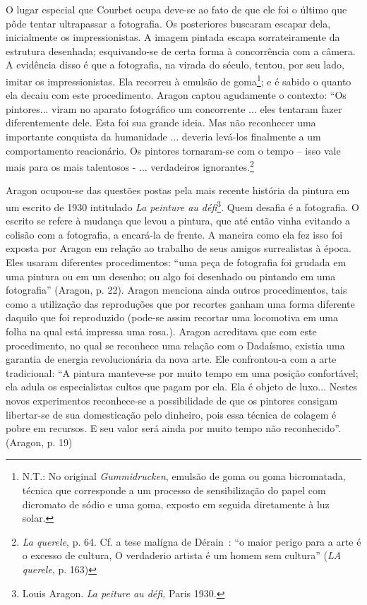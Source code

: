 O lugar especial que Courbet ocupa deve-se ao fato de que ele foi o
último que pôde tentar ultrapassar a fotografia. Os posteriores buscaram
escapar dela, inicialmente os impressionistas. A imagem pintada escapa
sorrateiramente da estrutura desenhada; esquivando-se de certa forma à
concorrência com a câmera. A evidência disso é que a fotografia, na
virada do século, tentou, por seu lado, imitar os impressionistas. Ela
recorreu à emulsão de goma\footnote{N.T.: No original
  \emph{Gummidrucken}, emulsão de goma ou goma bicromatada, técnica que
  corresponde a um processo de sensibilização do papel com dicromato de
  sódio e uma goma, exposto em seguida diretamente à luz solar.}; e é
sabido o quanto ela decaiu com este procedimento. Aragon captou
agudamente o contexto: ``Os pintores... viram no aparato fotográfico um
concorrente ... eles tentaram fazer diferentemente dele. Esta foi sua
grande ideia. Mas não reconhecer uma importante conquista da humanidade
... deveria levá-los finalmente a um comportamento reacionário. Os
pintores tornaram-se com o tempo -- isso vale mais para os mais
talentosos - ... verdadeiros ignorantes.\footnote{\emph{La querele}, p.
  64. Cf. a tese malígna de Dérain~: ``o maior perigo para a arte é o
  excesso de cultura, O verdaderio artista é um homem sem cultura''
  (\emph{LA querele}, p. 163)}

Aragon ocupou-se das questões postas pela mais recente história da
pintura em um escrito de 1930 intitulado \emph{La peinture au
défi}\footnote{Louis Aragon. \emph{La peiture au défi,} Paris 1930.}.
Quem desafia é a fotografia. O escrito se refere à mudança que levou a
pintura, que até então vinha evitando a colisão com a fotografia, a
encará-la de frente. A maneira como ela fez isso foi exposta por Aragon
em relação ao trabalho de seus amigos surrealistas à época. Eles usaram
diferentes procedimentos: ``uma peça de fotografia foi grudada em uma
pintura ou em um desenho; ou algo foi desenhado ou pintando em uma
fotografia'' (Aragon, p. 22). Aragon menciona ainda outros
procedimentos, tais como a utilização das reproduções que por recortes
ganham uma forma diferente daquilo que foi reproduzido (pode-se assim
recortar uma locomotiva em uma folha na qual está impressa uma rosa.).
Aragon acreditava que com este procedimento, no qual se reconhece uma
relação com o Dadaísmo, existia uma garantia de energia revolucionária
da nova arte. Ele confrontou-a com a arte tradicional: ``A pintura
manteve-se por muito tempo em uma posição confortável; ela adula os
especialistas cultos que pagam por ela. Ela é objeto de luxo... Nestes
novos experimentos reconhece-se a possibilidade de que os pintores
consigam libertar-se de sua domesticação pelo dinheiro, pois essa
técnica de colagem é pobre em recursos. E seu valor será ainda por muito
tempo não reconhecido''. (Aragon, p. 19)

